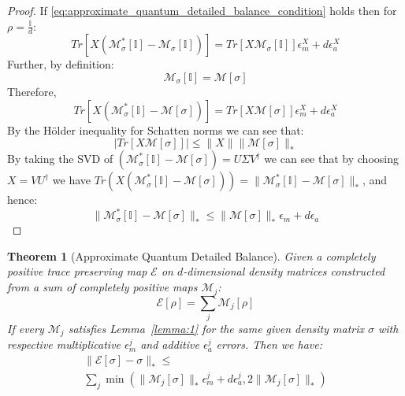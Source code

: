 \documentclass[aps,floatfix,10pt,amssymb,amsfont,amsmath,superscriptaddress,float,nofootinbib,longbibliography,nobalancelastpage,twocolumn]{revtex4-2}
\newtheorem{theorem}{Theorem}
\begin{document}
\begin{proof}
    If \eqref{eq:approximate_quantum_detailed_balance_condition} holds then for $\rho = \frac{\mathbb{I}}{d}$:
    \begin{equation}
        Tr\left[X (\mathcal{M}^*_{\sigma}[\mathbb{I}]-\mathcal{M}_{\sigma}[\mathbb{I}])\right] = Tr\left[X\mathcal{M}_{\sigma}[\mathbb{I}]\right]\epsilon^{X}_m + d\epsilon^{X}_a
    \end{equation}
    Further, by definition:
    \begin{equation}
        \mathcal{M}_{\sigma}[\mathbb{I}] = \mathcal{M}[\sigma]
    \end{equation}
    Therefore,
    \begin{equation}
    \label{eq:lhs}
        Tr\left[X (\mathcal{M}^*_{\sigma}[\mathbb{I}]-\mathcal{M}[\sigma])\right] = Tr\left[X\mathcal{M}[\sigma]\right]\epsilon^{ X}_m + d\epsilon^{X}_a
    \end{equation}
    By the H\"older inequality for Schatten norms we can see that: 
        \begin{equation}
        |Tr[X\mathcal{M}[\sigma]]| \leq \|X\|\|\mathcal{M}[\sigma]\|_*
    \end{equation}
    By taking the SVD of $(\mathcal{M}^*_{\sigma}[\mathbb{I}]-\mathcal{M}[\sigma]) = U\Sigma V^{\dagger}$ we can see that by choosing $X = VU^{\dagger}$ we have $Tr(X(\mathcal{M}^*_{\sigma}[\mathbb{I}]-\mathcal{M}[\sigma])) = \|\mathcal{M}^*_{\sigma}[\mathbb{I}]-\mathcal{M}[\sigma]\|_*$, and hence:
    \begin{equation}
        \|\mathcal{M}^*_{\sigma}[\mathbb{I}]-\mathcal{M}[\sigma]\|_* \leq \|\mathcal{M}[\sigma]\|_*\epsilon_m + d\epsilon_a
    \end{equation}
\end{proof}
\begin{theorem}[Approximate Quantum Detailed Balance]
\label{theorem:quantumapproximatedeatildedbalance}
Given a completely positive trace preserving map $\mathcal{E}$ on $d$-dimensional density matrices constructed from a sum of completely positive maps $\mathcal{M}_j$:
\begin{equation}
    \mathcal{E}[\rho] = \sum_j \mathcal{M}_j[\rho]
\end{equation}
If every $\mathcal{M}_j$ satisfies Lemma~\ref{lemma:1} for the same given density matrix $\sigma$ with respective multiplicative $\epsilon_m^j$ and additive $\epsilon_a^j$ errors. Then we have:
\begin{multline}
     \|\mathcal{E}[\sigma]-\sigma\|_* \leq \\\sum_j\min\left(\|\mathcal{M}_j[\sigma]\|_*\epsilon^j_m + d\epsilon^j_a, 2\|\mathcal{M}_j[\sigma]\|_*\right)
\end{multline}
\end{theorem}
\end{document}
